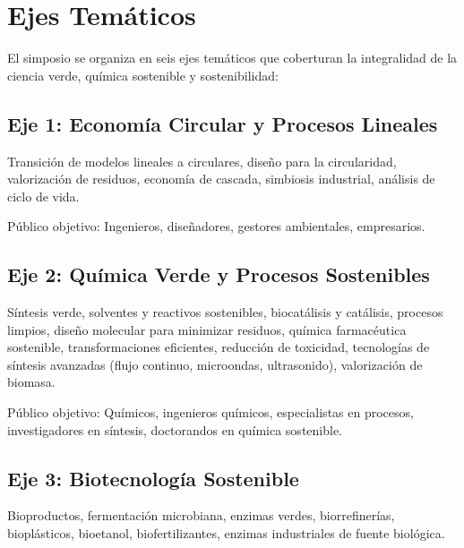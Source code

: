 \documentclass[12pt,a4paper]{article}
\begin{document}
\section{Ejes Temáticos}

El simposio se organiza en seis ejes temáticos que coberturan la integralidad de la ciencia verde, química sostenible y sostenibilidad:

\subsection{Eje 1: Economía Circular y Procesos Lineales}

\begin{tcolorbox}[cajainfo, title=Tópicos principales]
Transición de modelos lineales a circulares, diseño para la circularidad, valorización de residuos, economía de cascada, simbiosis industrial, análisis de ciclo de vida.
\end{tcolorbox}

Público objetivo: Ingenieros, diseñadores, gestores ambientales, empresarios.

\subsection{Eje 2: Química Verde y Procesos Sostenibles}

\begin{tcolorbox}[cajainfo, title=Tópicos principales]
Síntesis verde, solventes y reactivos sostenibles, biocatálisis y catálisis, procesos limpios, diseño molecular para minimizar residuos, química farmacéutica sostenible, transformaciones eficientes, reducción de toxicidad, tecnologías de síntesis avanzadas (flujo continuo, microondas, ultrasonido), valorización de biomasa.
\end{tcolorbox}

Público objetivo: Químicos, ingenieros químicos, especialistas en procesos, investigadores en síntesis, doctorandos en química sostenible.

\subsection{Eje 3: Biotecnología Sostenible}

\begin{tcolorbox}[cajainfo, title=Tópicos principales]
Bioproductos, fermentación microbiana, enzimas verdes, biorrefinerías, bioplásticos, bioetanol, biofertilizantes, enzimas industriales de fuente biológica.
\end{tcolorbox}
\end{document}
